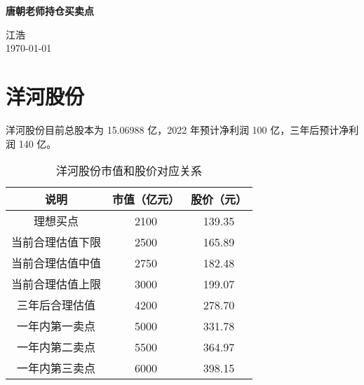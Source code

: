 \documentclass[12pt, a4paper, UTF8, fontset=adobe, oneside]{ctexbook} %
\begin{document}
\frontmatter
\begin{titlepage}
\begin{center}

\vspace*{5cm}
{\huge \bfseries 唐朝老师持仓买卖点}\\[0.4cm]

\vspace{12cm}

{\large 江浩} \\[1cm]
{\large \today}

\end{center}
\end{titlepage}

{
\hypersetup{linkcolor=black} %
\tableofcontents %
}

\mainmatter%

\chapter{洋河股份}
\begin{center}
\end{center}

\newpage
洋河股份目前总股本为 15.06988 亿，2022 年预计净利润 100 亿，三年后预计净利润 140
亿。

\begin{table}[htbp]
  \caption{洋河股份市值和股价对应关系}
  \begin{center}
  \begin{tabular}{ccc}
    \toprule
    说明 & 市值（亿元）& 股价（元）  \\
    \midrule
    理想买点 & 2100 & 139.35  \\
    当前合理估值下限 & 2500 & 165.89  \\
    当前合理估值中值 & 2750 & 182.48  \\
    当前合理估值上限 & 3000 & 199.07  \\
    三年后合理估值 & 4200 & 278.70  \\
    一年内第一卖点 & 5000 & 331.78  \\
    一年内第二卖点 & 5500 & 364.97  \\
    一年内第三卖点 & 6000 & 398.15  \\
    \bottomrule
  \end{tabular}
\end{center}
\end{table}



\end{document}
